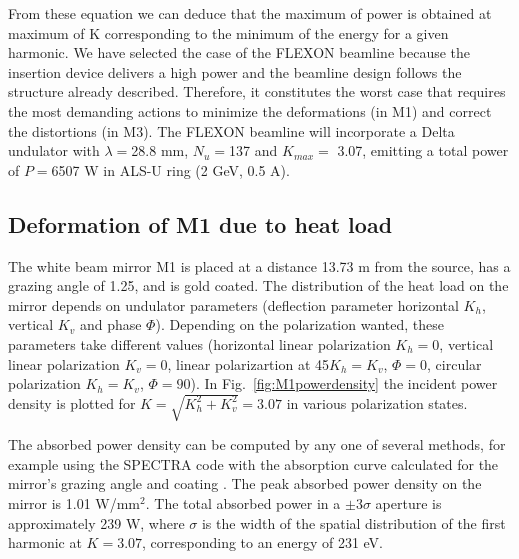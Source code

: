 \documentclass[]{spie}  %
\newcommand{\todo}[1]{{\color{red}[TODO: "#1'']}}
\begin{document}
From these equation we can deduce that the maximum of power is obtained at maximum of K corresponding to the minimum of the energy for a given harmonic.  We have selected the case of the FLEXON beamline because the insertion device delivers a high power and the beamline design follows the structure already described. Therefore, it constitutes the worst case that requires the most demanding actions to minimize the deformations (in M1) and correct the distortions (in M3). The FLEXON beamline will incorporate a Delta undulator \cite{deltaundulator} with $\lambda=$28.8 mm, $N_u=$137 and $K_{max}=$ 3.07, emitting a total power of $P=$6507 W in ALS-U ring (2 GeV,  0.5 A).

\subsection{Deformation of M1 due to heat load}



The white beam mirror M1 is placed at a distance 13.73 m from the source, has a grazing angle of 1.25\textdegree, and is gold coated. The distribution of the heat load on the mirror depends on undulator parameters (deflection parameter horizontal $K_h$, vertical $K_v$ and phase $\Phi$). Depending on the polarization wanted, these parameters take different values (horizontal linear polarization $K_h=0$, vertical linear polarization $K_v=0$, linear polarizartion at 45\textdegree $K_h=K_v$, $\Phi=0$, circular polarization $K_h=K_v$, $\Phi=90$\textdegree ). In Fig.~\ref{fig:M1powerdensity} the incident power density is plotted for $K=\sqrt{K_h^2 + K_v^2}=3.07$ in various polarization states.

The absorbed power density can be computed by any one of several methods, for example using the SPECTRA code with the absorption curve calculated for the mirror's grazing angle and coating \cite{codeSPECTRA}.  The peak absorbed power density on the mirror is 1.01 W/mm$^2$. The total absorbed power in a $\pm 3 \sigma$ aperture is approximately 239 W, where $\sigma$ is the width of the spatial distribution of the first harmonic at $K=3.07$, corresponding to an energy of 231 eV.
\end{document}
